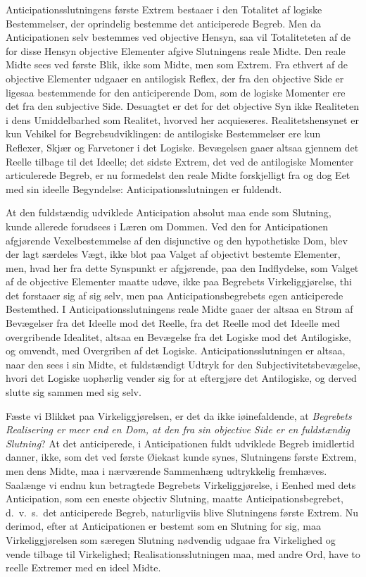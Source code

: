 \documentclass[12pt]{book}
\newcommand{\opage}[1]{\marginnote{\footnotesize\textit{[#1]}}}
\begin{document}
Anticipationsslutningens første Extrem bestaaer i den Totalitet af logiske Bestemmelser, der oprindelig bestemme det anticiperede Begreb. Men da Anticipationen selv bestemmes ved objective Hensyn, saa vil Totaliteteten %
af de for disse Hensyn objective Elementer afgive Slutningens reale Midte. Den reale Midte sees ved første Blik, ikke som Midte, men som Extrem. Fra ethvert af de objective Elementer udgaaer en antilogisk Reflex, der fra den objective Side er ligesaa bestemmende for den anticiperende Dom, som de logiske Momenter ere det fra den subjective Side. Desuagtet er det for det objective Syn ikke Realiteten i dens Umiddelbarhed som Realitet, hvorved her acquieseres. Realitetshensynet er kun Vehikel for Begrebsudviklingen: de antilogiske Bestemmelser ere kun Reflexer, Skjær og Farvetoner i det Logiske. Bevægelsen gaaer altsaa gjennem det Reelle tilbage til det Ideelle; det sidste Extrem, det ved de antilogiske Momenter articulerede Begreb, er nu formedelst den reale Midte forskjelligt fra og dog Eet med sin ideelle Begyndelse: Anticipationsslutningen er fuldendt.

At den fuldstændig udviklede Anticipation absolut maa ende som Slutning, kunde allerede forudsees i Læren om Dommen. Ved den for Anticipationen afgjørende Vexelbestemmelse af den disjunctive og den hypothetiske Dom, blev der lagt særdeles Vægt, ikke blot paa Valget af objectivt bestemte Elementer, men, hvad her fra dette Synspunkt er afgjørende, paa den Indflydelse, som Valget af de objective Elementer maatte udøve, ikke paa Begrebets Virkeliggjørelse, thi det forstaaer sig af sig selv, men paa Anticipationsbegrebets egen anticiperede Bestemthed. I Anticipationsslutningens reale Midte gaaer der altsaa en Strøm af Bevægelser fra
\opage{403}det Ideelle mod det Reelle, fra det Reelle mod det Ideelle med overgribende Idealitet, altsaa en Bevægelse fra det Logiske mod det Antilogiske, og omvendt, med Overgriben af det Logiske. Anticipationsslutningen er altsaa, naar den sees i sin Midte, et fuldstændigt Udtryk for den Subjectivitetsbevægelse, hvori det Logiske uophørlig vender sig for at eftergjøre det Antilogiske, og derved slutte sig sammen med sig selv.

Fæste vi Blikket paa Virkeliggjørelsen, er det da ikke iøinefaldende, at \emph{Begrebets Realisering er meer end en Dom, at den fra sin objective Side er en fuldstændig Slutning}? At det anticiperede, i Anticipationen fuldt udviklede Begreb imidlertid danner, ikke, som det ved første Øiekast kunde synes, Slutningens første Extrem, men dens Midte, maa i nærværende Sammenhæng udtrykkelig fremhæves. Saalænge vi endnu kun betragtede Begrebets Virkeliggjørelse, i Eenhed med dets Anticipation, som een eneste objectiv Slutning, maatte Anticipationsbegrebet, d.\ v.\ s.\ det anticiperede Begreb, naturligviis blive Slutningens første Extrem. Nu derimod, efter at Anticipationen er bestemt som en Slutning for sig, maa Virkeliggjørelsen som særegen Slutning nødvendig udgaae fra Virkelighed og vende tilbage til Virkelighed; Realisationsslutningen maa, med andre Ord, have to reelle Extremer med en ideel Midte.
\end{document}
